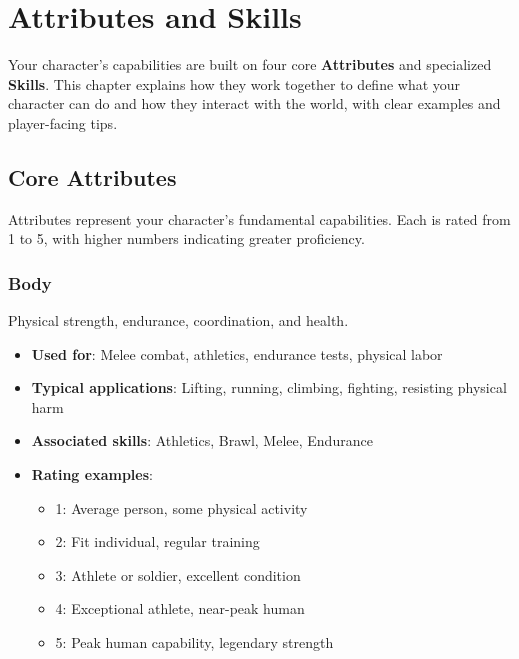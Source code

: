
\chapter{Attributes and Skills}
\label{ch:attributes-skills}

\begin{multicols}{2}

Your character's capabilities are built on four core \textbf{Attributes} and specialized \textbf{Skills}. This chapter explains how they work together to define what your character can do and how they interact with the world, with clear examples and player-facing tips.

\section{Core Attributes}

Attributes represent your character's fundamental capabilities. Each is rated from 1 to 5, with higher numbers indicating greater proficiency.

\subsection*{Body}

Physical strength, endurance, coordination, and health.
\begin{itemize}
\item \textbf{Used for}: Melee combat, athletics, endurance tests, physical labor
\item \textbf{Typical applications}: Lifting, running, climbing, fighting, resisting physical harm
\item \textbf{Associated skills}: Athletics, Brawl, Melee, Endurance
\item \textbf{Rating examples}:
  \begin{itemize}
    \item 1: Average person, some physical activity
    \item 2: Fit individual, regular training
    \item 3: Athlete or soldier, excellent condition
    \item 4: Exceptional athlete, near-peak human
    \item 5: Peak human capability, legendary strength
  \end{itemize}
\end{itemize}


\end{multicols}
